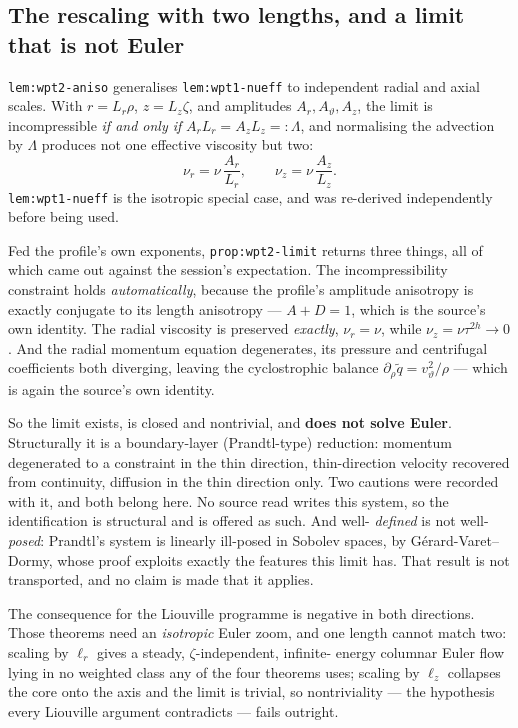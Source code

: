 \subsection{The rescaling with two lengths, and a limit that is not Euler}

\texttt{lem:wpt2-aniso} generalises \texttt{lem:wpt1-nueff} to independent
radial and axial scales. With \(r=L_r\rho\), \(z=L_z\zeta\), and amplitudes
\(A_r,A_\vartheta,A_z\), the limit is incompressible \emph{if and only if}
\(A_rL_r=A_zL_z=:\Lambda\), and normalising the advection by \(\Lambda\)
produces not one effective viscosity but two:
\[
  \nu_r=\nu\,\frac{A_r}{L_r},\qquad \nu_z=\nu\,\frac{A_z}{L_z}.
\]
\texttt{lem:wpt1-nueff} is the isotropic special case, and was re-derived
independently before being used.

Fed the profile's own exponents, \texttt{prop:wpt2-limit} returns three things,
all of which came out against the session's expectation. The incompressibility
constraint holds \emph{automatically}, because the profile's amplitude
anisotropy is exactly conjugate to its length anisotropy --- \(A+D=1\), which is
the source's own identity. The radial viscosity is preserved \emph{exactly},
\(\nu_r=\nu\), while \(\nu_z=\nu\tau^{2h}\to0\). And the radial momentum
equation degenerates, its pressure and centrifugal coefficients both diverging,
leaving the cyclostrophic balance \(\partial_\rho\tilde q=v_\vartheta^2/\rho\)
--- which is again the source's own identity.

So the limit exists, is closed and nontrivial, and \textbf{does not solve
Euler}. Structurally it is a boundary-layer (Prandtl-type) reduction: momentum
degenerated to a constraint in the thin direction, thin-direction velocity
recovered from continuity, diffusion in the thin direction only. Two cautions
were recorded with it, and both belong here. No source read writes this system,
so the identification is structural and is offered as such. And well-%
\emph{defined} is not well-\emph{posed}: Prandtl's system is linearly ill-posed
in Sobolev spaces, by Gérard-Varet--Dormy, whose proof exploits exactly the
features this limit has. That result is not transported, and no claim is made
that it applies.

The consequence for the Liouville programme is negative in both directions.
Those theorems need an \emph{isotropic} Euler zoom, and one length cannot match
two: scaling by \(\ell_r\) gives a steady, \(\zeta\)-independent, infinite-%
energy columnar Euler flow lying in no weighted class any of the four theorems
uses; scaling by \(\ell_z\) collapses the core onto the axis and the limit is
trivial, so nontriviality --- the hypothesis every Liouville argument
contradicts --- fails outright.

